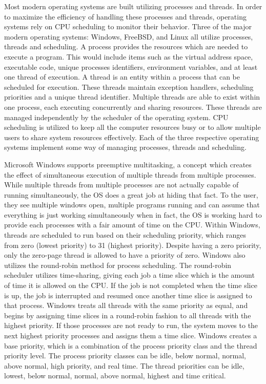 \documentclass[letterpaper,10pt,draftclsnofoot,onecolumn,titlepage]{IEEEtran}
\begin{document}
	Most modern operating systems are built utilizing processes and threads.
	In order to maximize the efficiency of handling these processes and threads, operating systems rely on CPU scheduling to monitor their behavior.
	Three of the major modern operating systems: Windows, FreeBSD, and Linux all utilize processes, threads and scheduling.
	A process provides the resources which are needed to execute a program.
	This would include items such as the virtual address space, executable code, unique processes identifiers, environment variables, and at least one thread of execution.
	A thread is an entity within a process that can be scheduled for execution. These threads maintain exception handlers, scheduling priorities and a unique thread identifier. Multiple threads are able to exist within one process, each executing concurrently and sharing resources.
	These threads are managed independently by the scheduler of the operating system.
	CPU scheduling is utilized to keep all the computer resources busy or to allow multiple users to share system resources effectively.
	Each of the three respective operating systems implement some way of managing processes, threads and scheduling.

	Microsoft Windows supports preemptive multitasking, a concept which creates the effect of simultaneous execution of multiple threads from multiple processes. While multiple threads from multiple processes are not actually capable of running simultaneously, the OS does a great job at hiding that fact.
	To the user, they see multiple windows open, multiple programs running and can assume that everything is just working simultaneously when in fact, the OS is working hard to provide each processes with a fair amount of time on the CPU.
	Within Windows, threads are scheduled to run based on their scheduling priority, which ranges from zero (lowest priority) to 31 (highest priority).
	Despite having a zero priority, only the zero-page thread is allowed to have a priority of zero. Windows also utilizes the round-robin method for process scheduling.
	The round-robin scheduler utilizes time-sharing, giving each job a time slice which is the amount of time it is allowed on the CPU.
	If the job is not completed when the time slice is up, the job is interrupted and resumed once another time slice is assigned to that process.
	Windows treats all threads with the same priority as equal, and begins by assigning time slices in a round-robin fashion to all threads with the highest priority.
	If those processes are not ready to run, the system moves to the next highest priority processes and assigns them a time slice.
	Windows creates a base priority, which is a combination of the process priority class and the thread priority level.
	The process priority classes can be idle, below normal, normal, above normal, high priority, and real time.
	The thread priorities can be idle, lowest, below normal, normal, above normal, highest and time critical.
\end{document}
